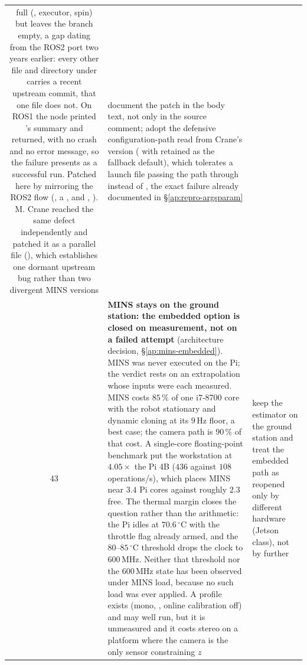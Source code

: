 \begin{longtable}{@{}cL{6.2cm}L{6.8cm}@{}}
    full (, executor, spin) but leaves the
     branch empty, a gap dating from the
    ROS2 port two years earlier: every other file and directory under
     carries a recent upstream commit, that one file does
    not. On ROS1 the node printed 's summary and
    returned, with no crash and no error message, so the failure presents
    as a successful run. Patched here by mirroring the ROS2 flow
    (, a ,  and
    , ). M. Crane reached the same
    defect independently and patched it as a parallel file
    (), which establishes one dormant
    upstream bug rather than two divergent MINS versions &
    document the patch in the body text, not only in the source comment;
    adopt the defensive configuration-path read from Crane's version
    ( with  retained as the
    fallback default), which tolerates a launch file passing the path
    through  instead of , the exact failure
    already documented in \S\ref{ap:repro-argsparam} \\
43 & \textbf{MINS stays on the ground station: the embedded option is closed
    on measurement, not on a failed attempt} (architecture decision,
    \S\ref{ap:mins-embedded}). MINS was never executed on the Pi; the
    verdict rests on an extrapolation whose inputs were each measured.
    MINS costs $85\,\%$ of one i7-8700 core with the robot stationary and
    dynamic cloning at its $9$\,Hz floor, a best case; the camera path is
    $90\,\%$ of that cost. A single-core floating-point benchmark put the
    workstation at $4.05\times$ the Pi 4B ($436$ against $108$
    operations/s), which places MINS near $3.4$ Pi cores against roughly
    $2.3$ free. The thermal margin closes the question rather than the
    arithmetic: the Pi idles at $70.6\,^{\circ}$C with the throttle flag
    already armed, and the $80$--$85\,^{\circ}$C threshold drops the clock
    to $600$\,MHz. Neither that threshold nor the $600$\,MHz state has been
    observed under MINS load, because no such load was ever applied. A
     profile exists (mono, , online
    calibration off) and may well run, but it is unmeasured and it costs
    stereo on a platform where the camera is the only sensor constraining
    $z$ &
    keep the estimator on the ground station and treat the embedded path
    as reopened only by different hardware (Jetson class), not by further

\end{longtable}
